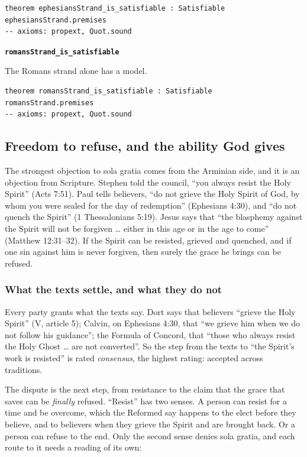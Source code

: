 \documentclass[11pt]{article}
\begin{document}
{\small\begin{verbatim}
theorem ephesiansStrand_is_satisfiable : Satisfiable ephesiansStrand.premises
-- axioms: propext, Quot.sound
\end{verbatim}}
\par\medskip\noindent\textbf{\texttt{romans\allowbreak{}Strand\_\allowbreak{}is\_\allowbreak{}satisfiable}}\par\nobreak\noindent
The Romans strand alone has a model.

{\small\begin{verbatim}
theorem romansStrand_is_satisfiable : Satisfiable romansStrand.premises
-- axioms: propext, Quot.sound
\end{verbatim}}
\subsection*{Freedom to refuse, and the ability God gives}
The strongest objection to sola gratia comes from the Arminian side, and it is an objection from Scripture. Stephen told the council, “you always resist the Holy Spirit” (Acts 7:51). Paul tells believers, “do not grieve the Holy Spirit of God, by whom you were sealed for the day of redemption” (Ephesians 4:30), and “do not quench the Spirit” (1 Thessalonians 5:19). Jesus says that “the blasphemy against the Spirit will not be forgiven … either in this age or in the age to come” (Matthew 12:31–32). If the Spirit can be resisted, grieved and quenched, and if one sin against him is never forgiven, then surely the grace he brings can be refused.

\subsubsection*{What the texts settle, and what they do not}
Every party grants what the texts say. Dort says that believers “grieve the Holy Spirit” (V, article 5); Calvin, on Ephesians 4:30, that “we grieve him when we do not follow his guidance”; the Formula of Concord, that “those who always resist the Holy Ghost … are not converted”. So the step from the texts to “the Spirit’s work is resisted” is rated \emph{consensus}, the highest rating: accepted across traditions.

The dispute is the next step, from resistance to the claim that the grace that saves can be \emph{finally} refused. “Resist” has two senses. A person can resist for a time and be overcome, which the Reformed say happens to the elect before they believe, and to believers when they grieve the Spirit and are brought back. Or a person can refuse to the end. Only the second sense denies sola gratia, and each route to it needs a reading of its own:
\end{document}
